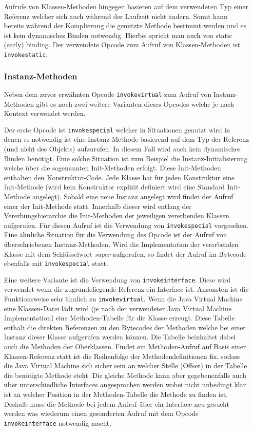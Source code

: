 \documentclass[conference]{IEEEtran}
\begin{document}
Aufrufe von Klassen-Methoden hingegen basieren auf dem verwendeten Typ einer Referenz welcher sich auch während der Laufzeit nicht ändern. Somit kann bereits während der Komplierung die genutzte Methode bestimmt werden und es ist kein dynamisches Binden notwendig. Hierbei spricht man auch von static (early) binding. Der verwendete Opcode zum Aufruf von Klassen-Methoden ist \verb|invokestatic|. \cite{Venners.1997}



\subsubsection{Instanz-Methoden}
Neben dem zuvor erwähnten Opcode \verb|invokevirtual| zum Aufruf von Instanz-Methoden gibt es noch zwei weitere Varianten dieses Opcodes welche je nach Kontext verwendet werden. 

Der erste Opcode ist \verb|invokespecial| welcher in Situationen genutzt wird in denen es notwendig ist eine Instanz-Methode basierend auf dem Typ der Referenz (und nicht des Objekts) aufzurufen. In diesem Fall wird auch kein dynamisches Binden benötigt. Eine solche Situation ist zum Beispiel die Instanz-Initialisierung welche über die sogenannten Init-Methoden erfolgt. Diese Init-Methoden enthalten den Konstruktur-Code. Jede Klasse hat für jeden Konstruktur eine Init-Methode (wird kein Konstruktor explizit definiert wird eine Standard Init-Methode angelegt). Sobald eine neue Instanz angelegt wird findet der Aufruf einer der Init-Methode statt. Innerhalb dieser wird entlang der Vererbungshierarchie die Init-Methoden der jeweiligen vererbenden Klassen aufgerufen. Für diesen Aufruf ist die Verwendung von \verb|invokespecial| vorgesehen. Eine ähnliche Situation für die Verwendung des Opcode ist der Aufruf von überschriebenen Instanz-Methoden. Wird die Implementation der vererbenden Klasse mit dem Schlüsselwort \textit{super} aufgerufen, so findet der Aufruf im Bytecode ebenfalls mit \verb|invokespecial| statt.

Eine weitere Variante ist die Verwendung von \verb|invokeinterface|. Diese wird verwendet wenn die zugrundeliegende Referenz ein Interface ist. Ansonsten ist die Funktionsweise sehr ähnlich zu \verb|invokevirtual|. Wenn die Java Virtual Machine eine Klassen-Datei lädt wird (je nach der verwendeter Java Virtual Machine Implementation) eine Methoden-Tabelle für die Klasse erzeugt. Diese Tabelle enthält die direkten Referenzen zu den Bytecodes der Methoden welche bei einer Instanz dieser Klasse aufgerufen werden können. Die Tabelle beinhaltet dabei auch die Methoden der Oberklassen. Findet ein Methoden-Aufruf auf Basis einer Klassen-Referenz statt ist die Reihenfolge der Methodendefinitionen fix, sodass die Java Virtual Machine sich sicher sein an welcher Stelle (Offset) in der Tabelle die benötigte Methode steht. Die gleiche Methode kann aber gegebenenfalls auch über unterschiedliche Interfaces angesprochen werden wobei nicht unbedingt klar ist an welcher Position in der Methoden-Tabelle die Methode zu finden ist. Deshalb muss die Methode bei jedem Aufruf über ein Interface neu gesucht werden was wiederum einen gesonderten Aufruf mit dem Opcode \verb|invokeinterface| notwendig macht.\cite{Venners.1997}
\end{document}
